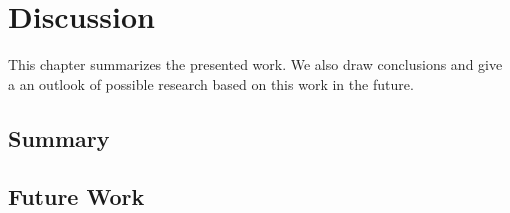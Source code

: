 \chapter{Discussion} \label{chapter:conclusions}

This chapter summarizes the presented work. We also draw conclusions and give a an outlook of possible research based on this work in the future.

\section{Summary}

\section{Future Work}




